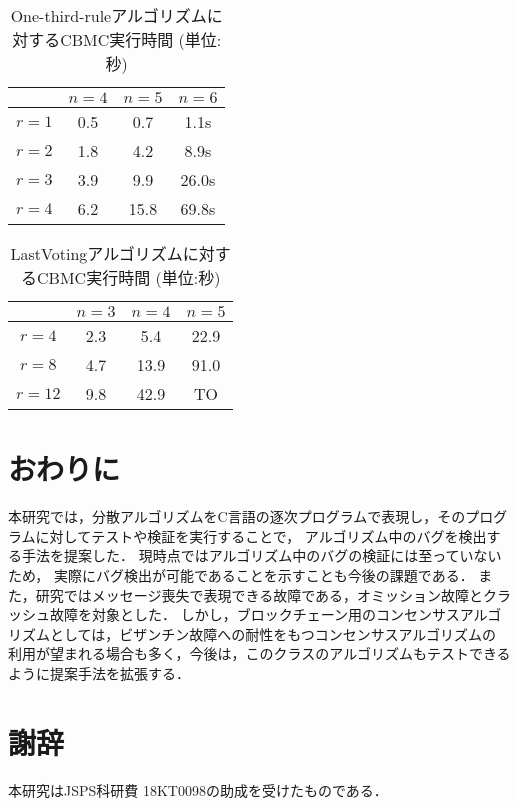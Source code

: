 \documentclass[technicalreport]{ieicej}
\theoremstyle{plain}
\begin{document}
\begin{table}[t]
    \centering
    \caption{One-third-ruleアルゴリズムに対するCBMC実行時間 (単位:秒)}\label{tab:onethird}
    \begin{tabular}{cccc}
        \hline
                &  $n=4$ & $n = 5$ & $n = 6$ \\ \hline
       $r = 1$ &   0.5  &  0.7  &   1.1s   \\ 
       $r = 2$ &   1.8  &  4.2  &   8.9s   \\ 
       $r = 3$ &   3.9  &  9.9  &  26.0s   \\ 
       $r = 4$ &   6.2  & 15.8  &  69.8s   \\       
       \hline

    \end{tabular}
\end{table}
\begin{table}[t]
    \centering
    \caption{LastVotingアルゴリズムに対するCBMC実行時間 (単位:秒)}\label{tab:lastvoting}
    \begin{tabular}{cccc}
        \hline
        &  $n=3$ & $n = 4$ & $n = 5$ \\ \hline
        $r = 4$ &  2.3  &  5.4  &  22.9   \\ 
        $r = 8$ &  4.7  & 13.9  &  91.0   \\ 
        $r = 12$ & 9.8  & 42.9  &  TO   \\ 
        \hline
    \end{tabular}
\end{table}

\section{おわりに}\label{sec:conclusion}

本研究では，分散アルゴリズムをC言語の逐次プログラムで表現し，そのプログラムに対してテストや検証を実行することで，
アルゴリズム中のバグを検出する手法を提案した．
現時点ではアルゴリズム中のバグの検証には至っていないため，
実際にバグ検出が可能であることを示すことも今後の課題である．
また，研究ではメッセージ喪失で表現できる故障である，オミッション故障とクラッシュ故障を対象とした．
しかし，ブロックチェーン用のコンセンサスアルゴリズムとしては，ビザンチン故障への耐性をもつコンセンサスアルゴリズムの
利用が望まれる場合も多く，今後は，このクラスのアルゴリズムもテストできるように提案手法を拡張する．

\section*{謝辞}
本研究はJSPS科研費 18KT0098の助成を受けたものである．





\end{document}
